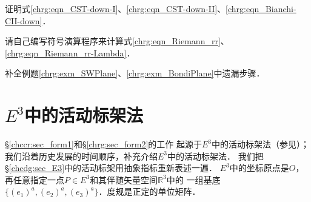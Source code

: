 \begin{exercise}
	证明式\eqref{chrg:eqn_CST-down-I}、\eqref{chrg:eqn_CST-down-II}、\eqref{chrg:eqn_Bianchi-CII-down}．
\end{exercise}

\begin{exercise}
	请自己编写符号演算程序来计算式\eqref{chrg:eqn_Riemann_rr}、\eqref{chrg:eqn_Riemann_rr-Lambda}．
\end{exercise}

\begin{exercise}
	补全例题\ref{chrg:exm_SWPlane}、\ref{chrg:exm_BondiPlane}中遗漏步骤．
\end{exercise}




\section{$E^3$中的活动标架法}\label{chrg:sec_E3MF}
\S \ref{chccr:sec_form1}和\S\ref{chrg:sec_form2}的工作
起源于$E^3$中的活动标架法（参见\parencite[\S 6.3]{cc2001-zh}）；
我们沿着历史发展的时间顺序，补充介绍$E^3$中的活动标架法．
我们把\S\ref{chcdg:sec_E3}中的活动标架用抽象指标重新表述一遍．
$E^3$中的坐标原点是$O$，再任意指定一点$P\in E^3$和其伴随矢量空间$\mathbb{R}^3$中的
一组基底$\{(e_1)^a,(e_2)^a,(e_3)^a\}$．度规是正定的单位矩阵．

